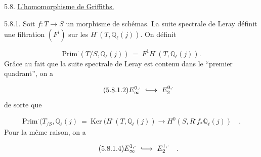 5.8. \underline{L'homomorphisme de Griffiths.}

5.8.1. Soit $f: T \longrightarrow S$ un morphisme de schémas. La suite spectrale de Leray définit une filtration $(F^i)$ sur les $H^{\cdot}(T,\mathbb{Q}_\ell(j))$. On définit

\begin{equation}\tag{5.8.1.1}
\mathrm{Prim}^{\cdot}(T/S,\mathbb{Q}_\ell(j)) \ = \ F^1H^{\cdot}(T,\mathbb{Q}_\ell(j)).
\end{equation}
Grâce au fait que la suite spectrale de Leray est contenu dans le ``premier quadrant'', on a

\begin{equation}\tag{5.8.1.2}
E_\infty^{0,\cdot} \ \lhook\joinrel\longrightarrow \ E_2^{0,\cdot}
\end{equation}
de sorte que

\begin{equation}\tag{5.8.1.3}
\mathrm{Prim}^{\cdot}(T_{/S},\mathbb{Q}_\ell(j) \ = \ \mathrm{Ker} \ (H^{\cdot}(T,\mathbb{Q}_\ell(j)) \longrightarrow H^0(S,R^{\cdot}f_*\mathbb{Q}_\ell(j)) \quad .
\end{equation}
Pour la même raison, on a

\begin{equation}\tag{5.8.1.4}
E_\infty^{1,\cdot} \ \lhook\joinrel\longrightarrow \ E_2^{1,\cdot} \quad .
\end{equation}